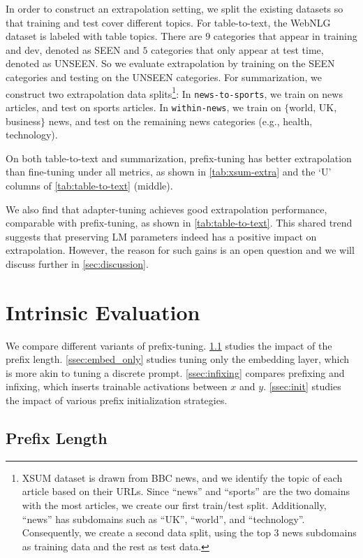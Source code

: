 In order to construct an extrapolation setting, we split the existing datasets so that training and test cover different topics. For table-to-text, the WebNLG dataset is labeled with table topics. There are $9$ categories that appear in training and dev, denoted as SEEN and $5$ categories that only appear at test time, denoted as UNSEEN. So we evaluate extrapolation by training on the SEEN categories and testing on the UNSEEN categories. For summarization, we construct two extrapolation data splits\footnote{XSUM dataset is drawn from BBC news, and we identify the topic of each article based on their URLs. Since ``news'' and ``sports'' are the two domains with the most articles, we create our first train/test split. Additionally, ``news'' has subdomains such as ``UK'', ``world'', and ``technology''. Consequently, we create a second data split, using the top 3 news subdomains as training data and the rest as test data.}: In \texttt{news-to-sports}, we train on news articles, and test on sports articles. In \texttt{within-news}, we train on $\{$world, UK, business$\}$ news, and test on the remaining news categories (e.g., health, technology). 

On both table-to-text and summarization, prefix-tuning has better extrapolation than fine-tuning under all metrics, as shown in \ref{tab:xsum-extra} and the `U' columns of \ref{tab:table-to-text} (middle). 

We also find that adapter-tuning achieves good extrapolation performance, comparable with prefix-tuning, as shown in \ref{tab:table-to-text}. This shared trend suggests that preserving LM parameters indeed has a positive impact on extrapolation. However, the reason for such gains is an open question and we will discuss further in \ref{sec:discussion}. 

\section{Intrinsic Evaluation}
\label{sec:intrinsic}
We compare different variants of prefix-tuning. 
\ref{ssec:prefix_length} studies the impact of the prefix length.
\ref{ssec:embed_only} studies tuning only the embedding layer, which is more akin to tuning a discrete prompt. 
\ref{ssec:infixing} compares prefixing and infixing, which inserts trainable activations between $x$ and $y$.  
\ref{ssec:init} studies the impact of various prefix initialization strategies.

\subsection{Prefix Length}
\label{ssec:prefix_length}

